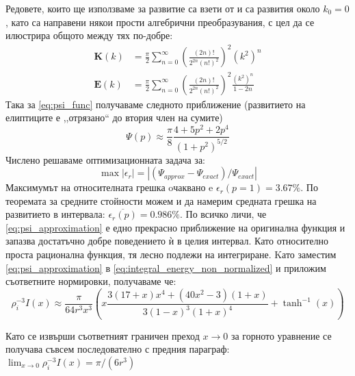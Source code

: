 Редовете, които ще използваме за развитие са взети от \cite{gradshteyn} и са развития около $k_0 = 0$ , като са направени някои прости алгебрични преобразувания, с цел да се илюстрира общото между тях по-добре:
\begin{align*}
	\boldsymbol{K}(k) & =\frac{\pi}{2}   \sum _{n=0}^{\infty } \left(\frac{(2 n)!}{2^{2 n} (n!)^2}\right)^2 \left(k^2\right)^n               \\
	\boldsymbol{E}(k) & =\frac{\pi}{2}   \sum _{n=0}^{\infty } \left(\frac{(2 n)!}{2^{2 n} (n!)^2}\right)^2 \frac{\left(k^2\right)^n}{1-2 n} 
\end{align*}	
Така за \autoref{eq:psi_func} получаваме следното приближение (развитието на елиптиците е ,,отрязано`` до втория член на сумите)
\begin{equation}
	\Psi(p) \approx \frac{\pi}{8} \frac{4+5p^2+2p^4}{(1+p^2)^{5/2}}
	\label{eq:psi_approximation}
\end{equation}
Числено решаваме оптимизационната задача за: 
\begin{equation*}
	\max |\epsilon_r| = |(\Psi_{approx}-\Psi_{exact})/\Psi_{exact}|
\end{equation*}
Максимумът на относителната грешка oчаквано e $\epsilon_r(p = 1) = 3.67\%$. По теоремата за средните стойности можем и да намерим
средната грешка на развитието в интервала: $\overline{\epsilon_r(p)} = 0.986\%$. По всичко личи, че \autoref{eq:psi_approximation} е едно прекрасно приближение на оригинална функция и запазва достатъчно добре поведението ѝ в целия интервал.
Като относително проста рационална функция, тя лесно подлежи на интегриране. Kато заместим \autoref{eq:psi_approximation} в \autoref{eq:integral_energy_non_normalized} и приложим съответните нормировки, получаваме че:
\begin{equation}
	\label{eq:arctan_approx}
	\rho_{i}^{-3} I(x) \approx \frac{\pi }{64 r^3 x^3} \left( x \frac{3 (17+x) x^4+\left(40 x^2-3\right) (1+x)}{3 (1-x)^3 (1+x)^4} +\tanh ^{-1}(x) \right)
\end{equation}

Като се извърши съответният граничен преход $ x \rightarrow 0 $ за горното уравнение се получава съвсем последователно с предния параграф:  $\lim_{x\to 0} \rho_{i}^{-3} I(x) = \pi/(6 r^3)$